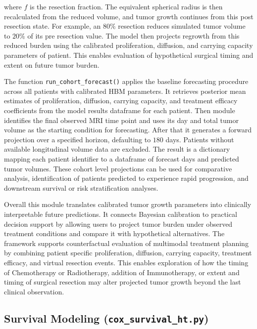 where $f$ is the resection fraction. The equivalent spherical radius is then recalculated from the reduced volume, and tumor growth continues from this post resection state. For example, an $80\%$ resection reduces simulated tumor volume to $20\%$ of its pre resection value. The model then projects regrowth from this reduced burden using the calibrated proliferation, diffusion, and carrying capacity parameters of patient. This enables evaluation of hypothetical surgical timing and extent on future tumor burden.

The function \texttt{run\_cohort\_forecast()} applies the baseline forecasting procedure across all patients with calibrated HBM parameters. It retrieves posterior mean estimates of proliferation, diffusion, carrying capacity, and treatment efficacy coefficients from the model results dataframe for each patient. Then module identifies the final observed MRI time point and uses its day and total tumor volume as the starting condition for forecasting. After that it generates a forward projection over a specified horizon, defaulting to $180$ days. Patients without available longitudinal volume data are excluded. The result is a dictionary mapping each patient identifier to a dataframe of forecast days and predicted tumor volumes. These cohort level projections can be used for comparative analysis, identification of patients predicted to experience rapid progression, and downstream survival or risk stratification analyses.

Overall this module translates calibrated tumor growth parameters into clinically interpretable future predictions. It connects Bayesian calibration to practical decision support by allowing users to project tumor burden under observed treatment conditions and compare it with hypothetical alternatives. The framework supports counterfactual evaluation of multimodal treatment planning by combining patient specific proliferation, diffusion, carrying capacity, treatment efficacy, and virtual resection events. This enables exploration of how the timing of Chemotherapy or Radiotherapy, addition of Immunotherapy, or extent and timing of surgical resection may alter projected tumor growth beyond the last clinical observation.



\subsection{Survival Modeling (\texttt{cox\_survival\_ht.py})}

